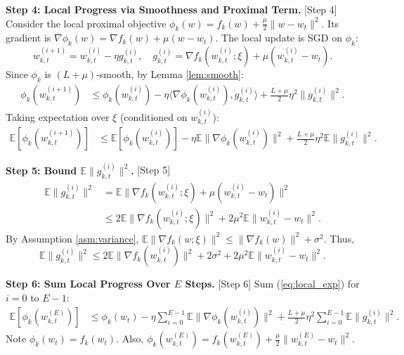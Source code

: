 \documentclass{article}
\begin{document}
\textbf{Step 4: Local Progress via Smoothness and Proximal Term.} [Step 4]
Consider the local proximal objective $\phi_k(w) = f_k(w) + \frac{\mu}{2} \| w - w_t \|^2$. Its gradient is $\nabla \phi_k(w) = \nabla f_k(w) + \mu (w - w_t)$. The local update is SGD on $\phi_k$:
\begin{equation}
    w_{k,t}^{(i+1)} = w_{k,t}^{(i)} - \eta g_{k,t}^{(i)}, \quad g_{k,t}^{(i)} = \nabla f_k(w_{k,t}^{(i)}; \xi) + \mu (w_{k,t}^{(i)} - w_t).
\end{equation}
Since $\phi_k$ is $(L+\mu)$-smooth, by Lemma \ref{lem:smooth}:
\begin{align}
    \phi_k(w_{k,t}^{(i+1)}) &\leq \phi_k(w_{k,t}^{(i)}) - \eta \langle \nabla \phi_k(w_{k,t}^{(i)}), g_{k,t}^{(i)} \rangle + \frac{L+\mu}{2} \eta^2 \| g_{k,t}^{(i)} \|^2. \label{eq:local_smooth}
\end{align}
Taking expectation over $\xi$ (conditioned on $w_{k,t}^{(i)}$):
\begin{align}
    \mathbb{E}[\phi_k(w_{k,t}^{(i+1)})] &\leq \mathbb{E}[\phi_k(w_{k,t}^{(i)})] - \eta \mathbb{E} \| \nabla \phi_k(w_{k,t}^{(i)}) \|^2 + \frac{L+\mu}{2} \eta^2 \mathbb{E} \| g_{k,t}^{(i)} \|^2. \label{eq:local_exp}
\end{align}

\textbf{Step 5: Bound $\mathbb{E} \| g_{k,t}^{(i)} \|^2$.} [Step 5]
\begin{align}
    \mathbb{E} \| g_{k,t}^{(i)} \|^2 &= \mathbb{E} \| \nabla f_k(w_{k,t}^{(i)}; \xi) + \mu (w_{k,t}^{(i)} - w_t) \|^2 \\
    &\leq 2 \mathbb{E} \| \nabla f_k(w_{k,t}^{(i)}; \xi) \|^2 + 2 \mu^2 \mathbb{E} \| w_{k,t}^{(i)} - w_t \|^2. \label{eq:g_bound}
\end{align}
By Assumption \ref{asm:variance}, $\mathbb{E} \| \nabla f_k(w; \xi) \|^2 \leq \| \nabla f_k(w) \|^2 + \sigma^2$. Thus,
\begin{equation}
    \mathbb{E} \| g_{k,t}^{(i)} \|^2 \leq 2 \mathbb{E} \| \nabla f_k(w_{k,t}^{(i)}) \|^2 + 2\sigma^2 + 2\mu^2 \mathbb{E} \| w_{k,t}^{(i)} - w_t \|^2. \label{eq:g_bound2}
\end{equation}

\textbf{Step 6: Sum Local Progress Over $E$ Steps.} [Step 6]
Sum (\ref{eq:local_exp}) for $i=0$ to $E-1$:
\begin{align}
    \mathbb{E}[\phi_k(w_{k,t}^{(E)})] &\leq \phi_k(w_t) - \eta \sum_{i=0}^{E-1} \mathbb{E} \| \nabla \phi_k(w_{k,t}^{(i)}) \|^2 + \frac{L+\mu}{2} \eta^2 \sum_{i=0}^{E-1} \mathbb{E} \| g_{k,t}^{(i)} \|^2. \label{eq:sum_local}
\end{align}
Note $\phi_k(w_t) = f_k(w_t)$. Also, $\phi_k(w_{k,t}^{(E)}) = f_k(w_{k,t}^{(E)}) + \frac{\mu}{2} \| w_{k,t}^{(E)} - w_t \|^2$.
\end{document}
